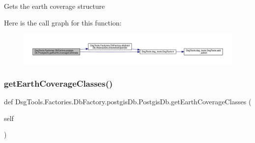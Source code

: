 \begin{DoxyVerb}Gets the earth coverage structure
\end{DoxyVerb}
 Here is the call graph for this function\+:
\nopagebreak
\begin{figure}[H]
\begin{center}
\leavevmode
\includegraphics[width=350pt]{class_dsg_tools_1_1_factories_1_1_db_factory_1_1postgis_db_1_1_postgis_db_a79250fa15afdb832f3cccc0abc556a6e_cgraph}
\end{center}
\end{figure}
\mbox{\label{class_dsg_tools_1_1_factories_1_1_db_factory_1_1postgis_db_1_1_postgis_db_a2f2b99da15dfe44411c6e10c6270db24}} 
\subsubsection{\texorpdfstring{get\+Earth\+Coverage\+Classes()}{getEarthCoverageClasses()}}
{\footnotesize\ttfamily def Dsg\+Tools.\+Factories.\+Db\+Factory.\+postgis\+Db.\+Postgis\+Db.\+get\+Earth\+Coverage\+Classes (\begin{DoxyParamCaption}\item[{}]{self }\end{DoxyParamCaption})}

